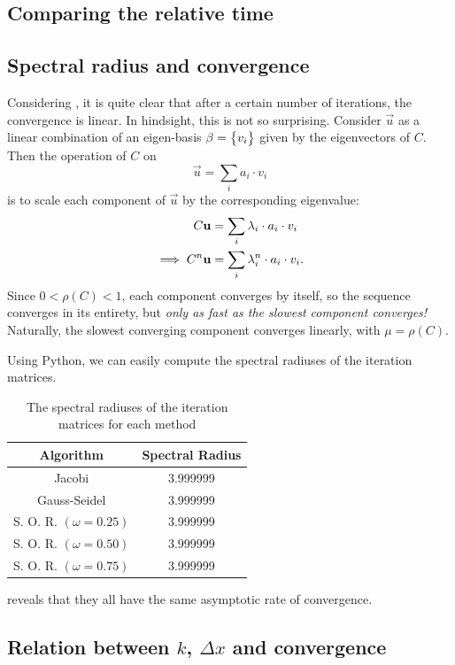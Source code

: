 \documentclass[12pt]{article}
\begin{document}
\begin{multicols}{2}
    \subsection{Comparing the relative time}
    \subsection{Spectral radius and convergence}
    Considering ,
    it is quite clear that after a certain number of iterations,
    the convergence is linear.
    In hindsight, this is not so surprising.
    Consider $\vec u$ as a linear combination of an eigen-basis
    $\beta = \Seq{v_i}$
    given by the eigenvectors of $C$.
    Then the operation of $C$ on
    \[
        \vec u = \sum_i a_i \cdot v_i
    \]
    is to scale each component of $\vec u$ by the corresponding eigenvalue:
    \begin{align*}
        C \vec u &= \sum_i \lambda_i \cdot a_i \cdot v_i \\
        \implies C^n \vec u &= \sum_i \lambda_i^n \cdot a_i \cdot v_i
        \text.
    \end{align*}
    Since $0 < \rho(C) < 1$, each component converges by itself,
    so the sequence converges in its entirety, but
    {\em only as fast as the slowest component converges!}
    Naturally, the slowest converging component converges linearly,
    with $\mu = \rho(C)$.

    Using Python, we can easily compute the spectral radiuses
    of the iteration matrices.
    \begin{table}[H]
        \centering
        \caption{The spectral radiuses of the iteration matrices for each method}
        \begin{tabular}{c S[table-format=1.6]}
            \hline\hline
            \bfseries Algorithm & \bfseries Spectral Radius \\
            \hline
            Jacobi                      & 3.999999\\
            Gauss-Seidel                & 3.999999\\
            S. O. R. $(\omega = 0.25)$  & 3.999999\\
            S. O. R. $(\omega = 0.50)$  & 3.999999\\
            S. O. R. $(\omega = 0.75)$  & 3.999999\\
            \hline
        \end{tabular}
        \label{table:rhos}
    \end{table}\noindent
     reveals that they all have the same asymptotic rate of convergence.


    \subsection{Relation between $k$, $\Delta x$ and convergence}


\end{multicols}
\end{document}
